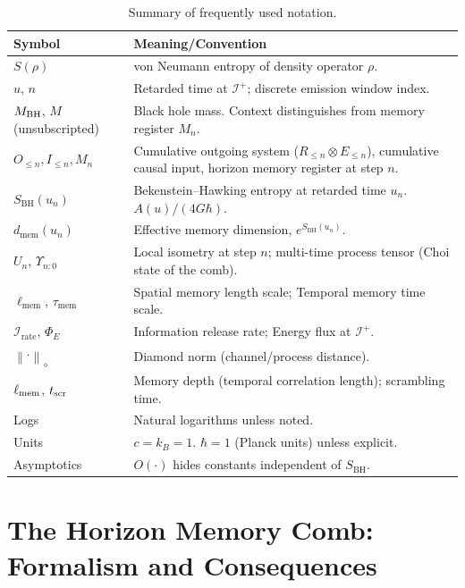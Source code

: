 \documentclass[a4paper,11pt]{article}
\newcommand{\Irate}{\mathcal{I}_{\mathrm{rate}}}
\newcommand{\Eflux}{\Phi_E}
\newcommand{\Ddiamond}[1]{\left\|#1\right\|_\diamond}
\newcommand{\dmem}{\ensuremath{d_{\mathrm{mem}}}}
\newcommand{\ellmem}{\ensuremath{\ell_{\mathrm{mem}}}}
\newcommand{\taumem}{\ensuremath{\tau_{\mathrm{mem}}}}
\theoremstyle{plain}
\theoremstyle{definition}
\theoremstyle{remark}
\begin{document}
\begin{table}[tbp]
\centering
\caption{Summary of frequently used notation.}
\label{tab:notation_summary}
\footnotesize
\begin{tabularx}{\textwidth}{@{}lX@{}}
\toprule
\textbf{Symbol} & \textbf{Meaning/Convention} \\
\midrule
\(S(\rho)\) & von Neumann entropy of density operator \(\rho\). \\
\(u\), \(n\) & Retarded time at \(\mathcal{I}^+\); discrete emission window index. \\
\(M_{\rm BH}\), \(M\) (unsubscripted) & Black hole mass. Context distinguishes from memory register $M_n$. \\
\(O_{\le n}, I_{\le n}, M_n\) & Cumulative outgoing system ($R_{\le n} \otimes E_{\le n}$), cumulative causal input, horizon memory register at step \(n\). \\
\(S_{\mathrm{BH}}(u_n)\) & Bekenstein--Hawking entropy at retarded time \(u_n\). \(A(u)/(4G\hbar)\). \\
\(\dmem(u_n)\) & Effective memory dimension, \(e^{S_{\mathrm{BH}}(u_n)}\). \\
\(U_n\), \(\Upsilon_{n{:}0}\) & Local isometry at step \(n\); multi-time process tensor (Choi state of the comb). \\
\(\ellmem\), \(\taumem\) & Spatial memory length scale; Temporal memory time scale. \\
\(\Irate\), \(\Eflux\) & Information release rate; Energy flux at ${\mathcal I}^+$. \\
\(\Ddiamond{\cdot}\) & Diamond norm (channel/process distance). \\
\(\ell_{\rm mem}\), \(t_{\rm scr}\) & Memory depth (temporal correlation length); scrambling time. \\
Logs & Natural logarithms unless noted. \\
Units & \(c=k_B=1\). $\hbar=1$ (Planck units) unless explicit. \\
Asymptotics & \(O(\cdot)\) hides constants independent of \(S_{\mathrm{BH}}\). \\
\bottomrule
\end{tabularx}
\end{table}


\section{The Horizon Memory Comb: Formalism and Consequences}
\label{sec:formalism_consequences}
\end{document}
